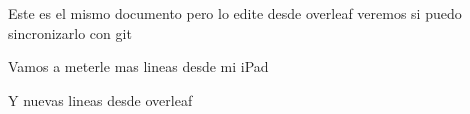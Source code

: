 \documentclass{article}
\begin{document}
	Este  es el mismo documento pero lo edite desde overleaf veremos si  puedo sincronizarlo con git
	
Vamos a meterle mas lineas desde mi iPad

Y nuevas lineas desde overleaf
    

 
\end{document}
